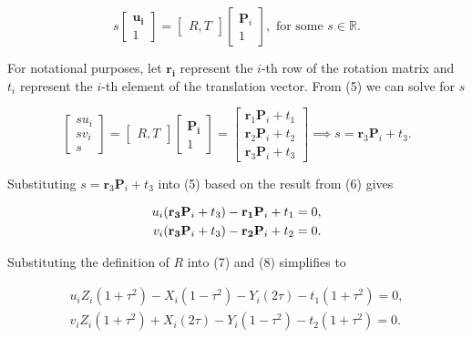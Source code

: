 \documentclass[12pt]{article}
\newcommand{\parens}[1]{\mathopen{}\left( {#1}_{{}_{}}\,\negthickspace\right)\mathclose{}}
\begin{document}
\begin{equation}
  s\begin{bmatrix}
    \mathbf{u_i}\\ 1
  \end{bmatrix}=\begin{bmatrix}
    R, T
  \end{bmatrix}\begin{bmatrix}
    \mathbf{P}_i\\ 1
  \end{bmatrix}, \text{ for some }s\in\mathbb{R}.
\end{equation}

For notational purposes, let $\mathbf{r_i}$ represent the $i$-th row of the rotation matrix and $t_i$ represent the $i$-th element of the translation vector.
From (5) we can solve for $s$

\begin{equation}
  \begin{bmatrix}
    su_i\\sv_i\\ s
  \end{bmatrix}=\begin{bmatrix}
    R, T
  \end{bmatrix}\begin{bmatrix}
    \mathbf{P_i}\\ 1
  \end{bmatrix}=\begin{bmatrix}
    \mathbf{r}_1\mathbf{P}_i+t_1\\\mathbf{r}_2\mathbf{P}_i+t_2\\\mathbf{r}_3\mathbf{P}_i+t_3
  \end{bmatrix}\implies s=\mathbf{r}_3\mathbf{P}_i+t_3.
\end{equation}

Substituting $s=\mathbf{r}_3\mathbf{P}_i+t_3$ into (5) based on the result from (6)  gives

\begin{align}
  u_i\parens{\mathbf{r_3}\mathbf{P}_i+t_3}-\mathbf{r_1}\mathbf{P}_i+t_1=0,\\
  v_i\parens{\mathbf{r_3}\mathbf{P}_i+t_3}-\mathbf{r_2}\mathbf{P}_i+t_2=0.
\end{align}

Substituting the definition of $R$ into (7) and (8) simplifies to

\begin{align}
  u_iZ_i(1+\tau^2)-X_i(1-\tau^2)-Y_i(2\tau)-t_1(1+\tau^2)=0,\\
  v_iZ_i(1+\tau^2)+X_i(2\tau)-Y_i(1-\tau^2)-t_2(1+\tau^2)=0.
\end{align}
\end{document}
